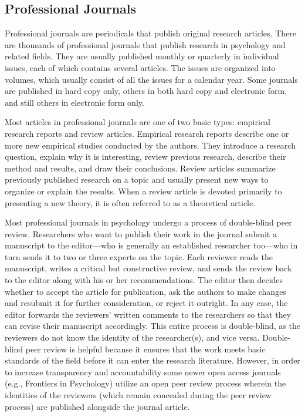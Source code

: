 \subsection{Professional Journals}
Professional journals are periodicals that publish original research articles. There are thousands of professional journals that publish research in psychology and related fields. They are usually published monthly or quarterly in individual issues, each of which contains several articles. The issues are organized into volumes, which usually consist of all the issues for a calendar year. Some journals are published in hard copy only, others in both hard copy and electronic form, and still others in electronic form only.
 
Most articles in professional journals are one of two basic types: empirical research reports and review articles. Empirical research reports describe one or more new empirical studies conducted by the authors. They introduce a research question, explain why it is interesting, review previous research, describe their method and results, and draw their conclusions. Review articles summarize previously published research on a topic and usually present new ways to organize or explain the results. When a review article is devoted primarily to presenting a new theory, it is often referred to as a theoretical article.

Most professional journals in psychology undergo a process of double-blind peer review. Researchers who want to publish their work in the journal submit a manuscript to the editor---who is generally an established researcher too---who in turn sends it to two or three experts on the topic. Each reviewer reads the manuscript, writes a critical but constructive review, and sends the review back to the editor along with his or her recommendations. The editor then decides whether to accept the article for publication, ask the authors to make changes and resubmit it for further consideration, or reject it outright. In any case, the editor forwards the reviewers' written comments to the researchers so that they can revise their manuscript accordingly. This entire process is double-blind, as the reviewers do not know the identity of the researcher(s), and vice versa. Double-blind peer review is helpful because it ensures that the work meets basic standards of the field before it can enter the research literature. However, in order to increase transparency and accountability some newer open access journals (e.g., Frontiers in Psychology) utilize an open peer review process wherein the identities of the reviewers (which remain concealed during the peer review process) are published alongside the journal article.

